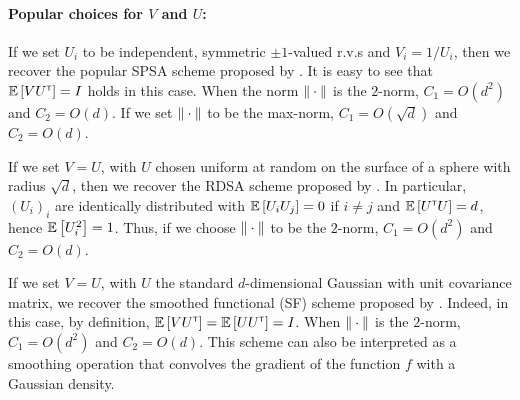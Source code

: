 \paragraph{Popular choices for $V$ and $U$:}

\begin{inparaenum}[$\bullet$]
 \item If we set $U_i$ to be independent, symmetric $\pm 1$-valued r.v.s and $V_i = 1/U_i$, then we recover the popular SPSA scheme proposed by \cite{spall1992multivariate}.
It is easy to see that $\mathbb{E}\left[  V U^\mathsf{\scriptscriptstyle T} \right] = I$ holds in this case.
 When the norm $\|\cdot\|$ is the $2$-norm, $C_1 = O(d^2)$ and $C_2 = O(d)$. If we set $\|\cdot\|$ to be the max-norm, $C_1 = O(\sqrt{d})$ and $C_2 = O(d)$.\\
 \item If we set $V=U$, with $U$ chosen uniform at random on the surface of a sphere with radius $\sqrt{d}$,
 then we recover the RDSA scheme proposed by  \citeauthor{kushcla} \citep[cf. pp.~58--60][]{kushcla}.
 In particular, $(U_i)_i$ are identically distributed with $\mathbb{E}\left[ U_i U_j \right] = 0$ if $i\ne j$ and $\mathbb{E}\left[ U^\mathsf{\scriptscriptstyle T} U \right] = d$, hence $\mathbb{E}\left[U_i^2\right] = 1$. Thus, if we choose $\|\cdot\|$ to be the $2$-norm, $C_1 = O( d^2 )$ and $C_2 = O(d)$.\\
 \item If we set $V=U$, with $U$ the standard $d$-dimensional Gaussian with unit covariance matrix, we recover the smoothed functional (SF) scheme proposed by \cite{katkul}.
Indeed, in this case, by definition, $\mathbb{E}\left[VU^\mathsf{\scriptscriptstyle T}\right] = \mathbb{E}\left[U U^\mathsf{\scriptscriptstyle T} \right] = I$.
When $\|\cdot\|$ is the $2$-norm, $C_1 = O(d^2)$
 and $C_2 = O( d)$.
 This scheme can also be interpreted as a smoothing operation that  convolves the gradient of the function $f$ with a Gaussian density.
\end{inparaenum}


